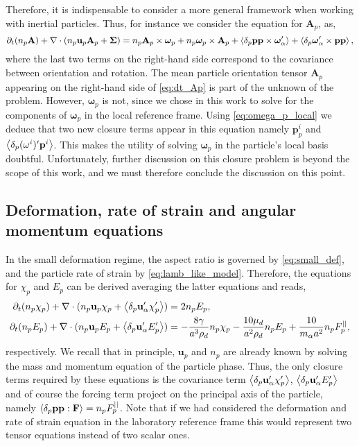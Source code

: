 Therefore, it is indispensable to consider a more general framework when working with inertial particles. 
Thus, for instance we consider the equation for $\textbf{A}_p$, as, 
\begin{equation*}
    \pddt (n_p\textbf{A})
    + \div (
        n_p\textbf{u}_p\textbf{A}_p
        + \mathbf{\Sigma}
        )
    =
    n_p \textbf{A}_p \times \bm\omega_p
    + n_p \bm\omega_p \times \textbf{A}_p
    + \pavg{\textbf{pp} \times \bm\omega_\alpha'}
    + \pavg{\bm\omega_\alpha' \times \textbf{pp}},
    \label{eq:dt_Ap}
\end{equation*}
where the last two terms on the right-hand side correspond to the covariance between orientation and rotation. 
The mean particle orientation tensor $\textbf{A}_p$ appearing on the right-hand side of \ref{eq:dt_Ap} is part of the unknown of the problem.
However, $\bm\omega_p$ is not, since we chose in this work to solve for the components of $\bm\omega_p$ in the local reference frame. 
Using \ref{eq:omega_p_local} we deduce that two new closure terms appear in this equation namely $\textbf{p}_p^i$ and $\left<\delta_p (\omega^i)' \textbf{p}^i\right>$. 
This makes the utility of solving $\bm\omega_p$ in the particle's local basis doubtful. 
Unfortunately, further discussion on this closure problem is beyond the scope of this work, and we must therefore conclude the discussion on this point.

\subsection{Deformation, rate of strain and angular momentum equations}

In the small deformation regime, the aspect ratio is governed by \ref{eq:small_def}, and the particle rate of strain by  \ref{eq:lamb_like_model}. 
Therefore, the equations for $\chi_p$ and $E_p$ can be derived averaging the latter equations and reads,  
\begin{align}
    \pddt (n_p \chi_p)
    + \div (
        n_p \textbf{u}_p \chi_p 
        + \pavg{\textbf{u}_\alpha' \chi_p'}
    )
    &= 2 n_p E_p,
    \label{eq:avg_chi_I}
    \\
    \pddt (n_p E_p)
    + \div (
        n_p \textbf{u}_p E_p 
        + \pavg{\textbf{u}_\alpha' E_p'}
    )
    &= 
    - \frac{8 \gamma }{a^3\rho_d} n_p \chi_p
    - \frac{10 \mu_d}{a^2\rho_d} n_p E_p
    + \frac{10}{m_\alpha a^2} n_p F^{||}_p,
    \label{eq:avg_E_I}
\end{align}
respectively.
We recall that in principle, $\textbf{u}_p$ and $n_p$ are already known by solving the mass and momentum equation of the particle phase.
Thus, the only closure terms required by these equations is the covariance term $\left<\delta_p \textbf{u}_\alpha' \chi_p'\right>$, $ \left<\delta_p \textbf{u}_\alpha' E_p'\right>$ and of course the forcing term project on the principal axis of the particle, namely $\left<\delta_p \textbf{pp} : \textbf{F}\right> = n_p F_p^{||}$. 
Note that if we had considered the deformation and rate of strain equation in the laboratory reference frame this would represent two tensor equations instead of two scalar ones. 


